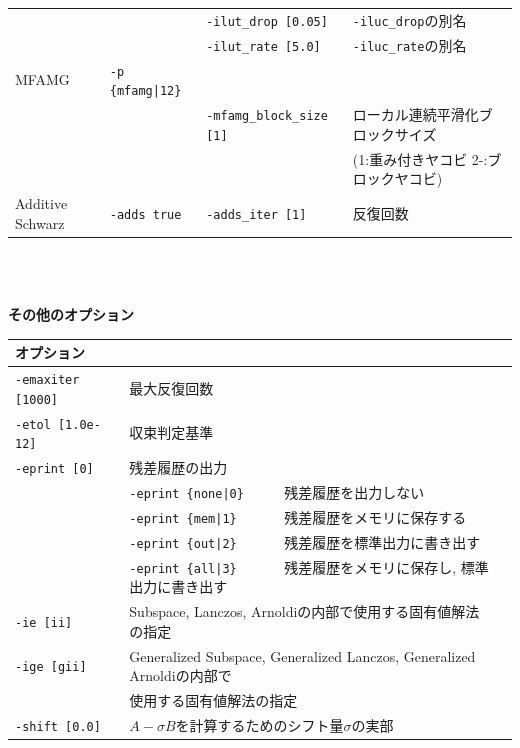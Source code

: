 \documentclass[a4paper]{jarticle}
\begin{document}
{{\begin{minipage}[t]{\textwidth}
\begin{center}
\begin{tabular}{l|lll}
         &                       & \verb=-ilut_drop [0.05]= & \verb=-iluc_drop=の別名 \\
         &                       & \verb=-ilut_rate [5.0]= & \verb=-iluc_rate=の別名 \\
MFAMG   & \verb=-p {mfamg|12}=  &                             &                            \\
         &                       & \verb=-mfamg_block_size [1]= & ローカル連続平滑化ブロックサイズ \\
         &                       &                              & (1:重み付きヤコビ 2-:ブロックヤコビ) \\
Additive Schwarz  & \verb=-adds true=   &  \verb=-adds_iter [1]= & 反復回数   \\
\hline         
\end{tabular}
\end{center}
\end{minipage}
\\ \\
\begin{minipage}[t]{\textwidth}
\begin{center}
{\bf その他のオプション}\\
\begin{tabular}{l|ll}\hline\hline
オプション &                          \\ \hline
\verb=-emaxiter [1000]= & 最大反復回数         \\ 
\verb=-etol [1.0e-12]=  & 収束判定基準              \\
\verb=-eprint [0]=      & 残差履歴の出力                 \\
                       & \verb=-eprint {none|0}     =  残差履歴を出力しない \\
                       & \verb=-eprint {mem|1}      =  残差履歴をメモリに保存する\\
                       & \verb=-eprint {out|2}      =  残差履歴を標準出力に書き出す\\
                       & \verb=-eprint {all|3}      =  残差履歴をメモリに保存し, 標準出力に書き出す\\
\verb=-ie [ii]= & Subspace, Lanczos, Arnoldiの内部で使用する固有値解法の指定  \\
\verb=-ige [gii]= & Generalized Subspace, Generalized Lanczos, Generalized Arnoldiの内部で\\
                       & 使用する固有値解法の指定  \\
\verb=-shift [0.0]= & $A-\sigma B$を計算するためのシフト量$\sigma$の実部 \\

\end{tabular}
\end{center}
\end{minipage}}}
\end{document}
